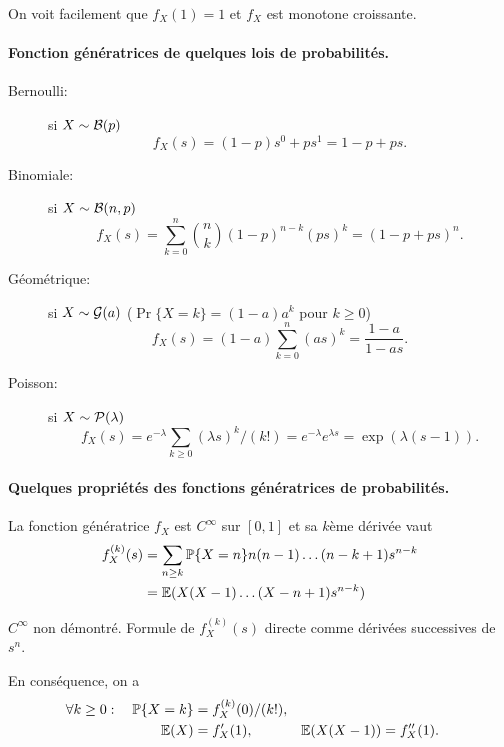 \remark
On voit facilement que $f_X(1) = 1$ et $f_X$ est monotone croissante.

\paragraph*{Fonction génératrices de quelques lois de probabilités.}
\begin{description}
  \item[Bernoulli:] si $X \sim \mathcal{B}(p)$ 
  $$
  f_X(s) = (1-p) s^0 + p s^1 = 1 - p + p s.
  $$
  \item[Binomiale:] si $X \sim \mathcal{B}(n, p)$
  $$
  f_X(s) = \sum_{k=0}^n {{n}\choose{k}} (1-p)^{n-k} (ps)^k = (1 - p + ps)^n.
  $$
  \item[Géométrique:] si $X \sim \mathcal{G}(a)$ ($\Pr\{X = k\} = (1-a) a^k$ pour $k \geq 0$)
  $$
  f_X(s) = (1-a) \sum_{k=0}^n (as)^k = \frac{1-a}{1 - as}.
  $$
  \item[Poisson:] si $X \sim \mathcal{P}(\lambda)$
  $$
  f_X(s) = e^{-\lambda} \sum_{k\geq0} (\lambda s)^k / (k!) = e^{-\lambda} e^{\lambda s} = \exp(\lambda(s-1)).
  $$
\end{description}

\paragraph*{Quelques propriétés des fonctions génératrices de probabilités.}

\begin{proposition}
  La fonction génératrice $f_X$ est $C^\infty$ sur $[0, 1]$ et sa $k$ème dérivée vaut
  \begin{align*}
    f_X^{(k)}(s) 
    & = \sum_{n \geq k} \operatorname{\mathbb{P}}\{X = n\} n(n-1)  \dots (n-k+1) s^{n-k} \\
    & = \operatorname{\mathbb{E}}(X (X-1) \dots (X-n+1) s^{n-k})
  \end{align*}
\end{proposition}

\proof
  $C^\infty$ non démontré. Formule de $f_X^{(k)}(s)$ directe comme dérivées successives de $s^n$.
\eproof

\begin{corollary}
  En conséquence, on a
  \begin{align*}
    \forall k \geq 0: \quad \operatorname{\mathbb{P}}\{X = k\} & = f_X^{(k)}(0) / (k!), \\
    \operatorname{\mathbb{E}}(X) & = f'_X(1), &
    \operatorname{\mathbb{E}}(X(X-1)) & = f''_X(1).
  \end{align*}
\end{corollary}

